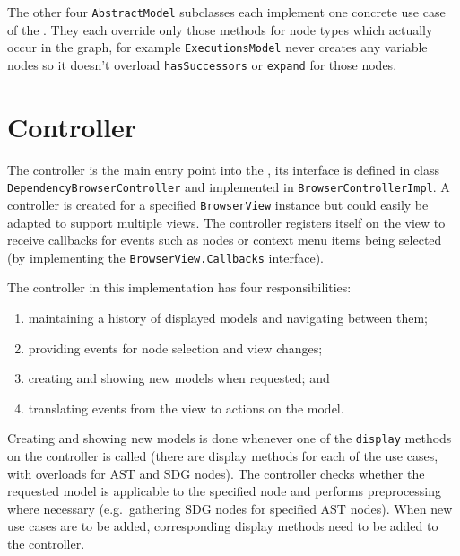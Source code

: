 
The other four \lstinline|AbstractModel| subclasses each implement one concrete use case of the \SB. They each override 
only those methods for node types which actually occur in the graph, for example \lstinline|ExecutionsModel| never 
creates any variable nodes so it doesn't overload \lstinline|hasSuccessors| or \lstinline|expand| for those nodes.


\section{Controller}

The controller is the main entry point into the \SB, its interface is defined in class 
\lstinline|DependencyBrowserController| and implemented in \lstinline|BrowserControllerImpl|. A controller is created 
for a specified \lstinline|BrowserView| instance but could easily be adapted to support multiple views. The controller 
registers itself on the view to receive callbacks for events such as nodes or context menu items being selected (by 
implementing the \lstinline|BrowserView.Callbacks| interface).

The controller in this implementation has four responsibilities:
\begin{enumerate}
  \item maintaining a history of displayed models and navigating between them;
  \item providing events for node selection and view changes;
  \item creating and showing new models when requested; and
  \item translating events from the view to actions on the model.
\end{enumerate}

Creating and showing new models is done whenever one of the \lstinline|display| methods on the controller is called 
(there are display methods for each of the use cases, with overloads for AST and SDG nodes). The controller checks 
whether the requested model is applicable to the specified node and performs preprocessing where necessary (e.g.\ 
gathering SDG nodes for specified AST nodes). When new use cases are to be added, corresponding display methods need to 
be added to the controller.

